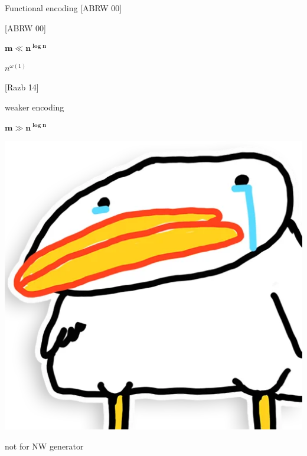 \begin{frame}{Functional encoding [ABRW 00]}
\begin{minipage}[t][3cm][t]{0.32\linewidth}
        \vspace{0.2cm}
        [ABRW 00]
    \end{minipage}
    \pause
    \begin{minipage}[t][3cm][t]{0.32\linewidth}
        \centering
        $\mathbf{m \ll n^{\log n}}$

        \pause
        \vspace{0.2cm}
        $n^{\omega(1)}$

        \vspace{0.2cm}
        [Razb 14]

        \pause
        \vspace{0.1cm}
        \alert{weaker encoding}
    \end{minipage}
    \pause
    \begin{minipage}[t][3cm][t]{0.32\linewidth}
        \centering
        $\mathbf{m \gg n^{\log n}}$

        \pause
        \vspace{0.2cm}
        \includegraphics[scale = 0.05]{pics/utia-cry.png}

        \pause
        \vspace{0.1cm}
        \alert{not for NW generator}
    \end{minipage}
\end{frame}


